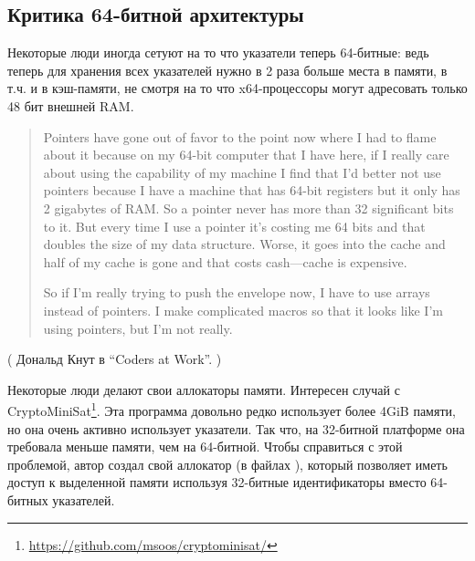 \subsection{Критика 64-битной архитектуры}

Некоторые люди иногда сетуют на то что указатели теперь 64-битные:
ведь теперь для хранения всех указателей нужно в 2 раза больше места 
в памяти, в т.ч. и в кэш-памяти, не смотря на то что x64-процессоры могут адресовать только 48 бит внешней \ac{RAM}.

\begin{framed}
\begin{quotation}
Pointers have gone out of favor to the point now where I had to
flame about it because on my 64-bit computer that I have here, if I really
care about using the capability of my machine I find that I’d better not use
pointers because I have a machine that has 64-bit registers but it only has 2
gigabytes of RAM. So a pointer never has more than 32 significant bits to it.
But every time I use a pointer it’s costing me 64 bits and that doubles the
size of my data structure. Worse, it goes into the cache and half of my
cache is gone and that costs cash—cache is expensive.

So if I’m really trying to push the envelope now, I have to use arrays instead
of pointers. I make complicated macros so that it looks like I’m using
pointers, but I’m not really.
\end{quotation}
\end{framed}

( Дональд Кнут в ``Coders at Work''. )

Некоторые люди делают свои аллокаторы памяти.
Интересен случай с CryptoMiniSat\footnote{\url{https://github.com/msoos/cryptominisat/}}.
Эта программа довольно редко использует более 4GiB памяти, но она очень активно использует указатели.
Так что, на 32-битной платформе она требовала меньше памяти, чем на 64-битной.
Чтобы справиться с этой проблемой, автор создал свой аллокатор (в файлах ),
который позволяет иметь доступ к выделенной памяти используя 32-битные идентификаторы вместо 64-битных указателей.

